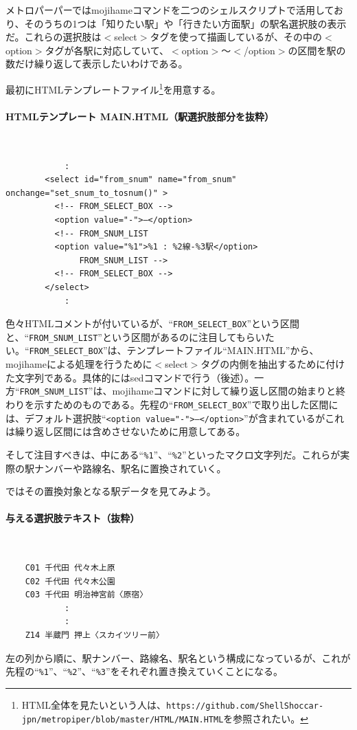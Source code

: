 メトロパーパーではmojihameコマンドを二つのシェルスクリプトで活用しており、そのうちの1つは「知りたい駅」や「行きたい方面駅」の駅名選択肢の表示だ。これらの選択肢は$<$select$>$タグを使って描画しているが、その中の$<$option$>$タグが各駅に対応していて、$<$option$>$～$<$/option$>$の区間を駅の数だけ繰り返して表示したいわけである。

最初にHTMLテンプレートファイル\footnote{HTML全体を見たいという人は、\verb|https://github.com/ShellShoccar-jpn/metropiper/blob/master/HTML/MAIN.HTML|を参照されたい。}を用意する。
\paragraph*{HTMLテンプレート MAIN.HTML（駅選択肢部分を抜粋）} 　\\
\begin{frameboxit}{160.0mm}
\begin{verbatim}
	        :
	    <select id="from_snum" name="from_snum" onchange="set_snum_to_tosnum()" >
	      <!-- FROM_SELECT_BOX -->
	      <option value="-">―</option>
	      <!-- FROM_SNUM_LIST
	      <option value="%1">%1 : %2線-%3駅</option>
	           FROM_SNUM_LIST -->
	      <!-- FROM_SELECT_BOX -->
	    </select>
	        :
\end{verbatim}
\end{frameboxit}

色々HTMLコメントが付いているが、``\verb|FROM_SELECT_BOX|''という区間と、``\verb|FROM_SNUM_LIST|''という区間があるのに注目してもらいたい。``\verb|FROM_SELECT_BOX|''は、テンプレートファイル``MAIN.HTML''から、mojihameによる処理を行うために$<$select$>$タグの内側を抽出するために付けた文字列である。具体的にはsedコマンドで行う（後述）。一方``\verb|FROM_SNUM_LIST|''は、mojihameコマンドに対して繰り返し区間の始まりと終わりを示すためのものである。先程の``\verb|FROM_SELECT_BOX|''で取り出した区間には、デフォルト選択肢``\verb|<option value="-">―</option>|''が含まれているがこれは繰り返し区間には含めさせないために用意してある。

そして注目すべきは、中にある``\verb|%1|''、``\verb|%2|''といったマクロ文字列だ。これらが実際の駅ナンバーや路線名、駅名に置換されていく。

ではその置換対象となる駅データを見てみよう。
\paragraph*{与える選択肢テキスト（抜粋）} 　\\
\begin{frameboxit}{160.0mm}
\begin{verbatim}
	C01 千代田 代々木上原
	C02 千代田 代々木公園
	C03 千代田 明治神宮前〈原宿〉
	        :
	        :
	Z14 半蔵門 押上〈スカイツリー前〉
\end{verbatim}
\end{frameboxit}
左の列から順に、駅ナンバー、路線名、駅名という構成になっているが、これが先程の``\verb|%1|''、``\verb|%2|''、``\verb|%3|''をそれぞれ置き換えていくことになる。

